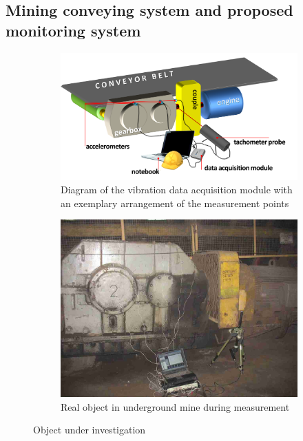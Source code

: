 \documentclass[10pt]{article}
\begin{document}
\subsection{Mining conveying system and proposed monitoring system}
\begin{figure}[!ht]
  \centering
  \begin{subfigure}[b]{0.57\textwidth}
      \centering
      \includegraphics[width=\textwidth]{wykresy/ga}
      \caption{Diagram of the vibration data acquisition module with an exemplary arrangement of the measurement points}
      \label{fig:Raw_map}
  \end{subfigure}
  \begin{subfigure}[b]{0.4\textwidth}
      \centering
		\includegraphics[width=\textwidth]{wykresy/gb}
        \caption{Real object in underground mine during measurement}
    \label{fig:Selectedinterpmap}
  \end{subfigure}
  \vspace{-5pt}
  \caption{Object under investigation}
  \label{fig:raw_interp_map}
\end{figure}
\end{document}
